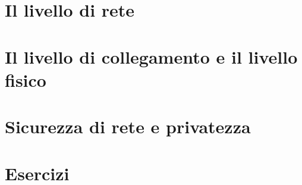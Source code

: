 \documentclass{unina_doc_class}
\begin{document}
  \part{Il livello di rete}

  \part{Il livello di collegamento e il livello fisico}

  \part{Sicurezza di rete e privatezza}

  \part{Esercizi}
\end{document}
